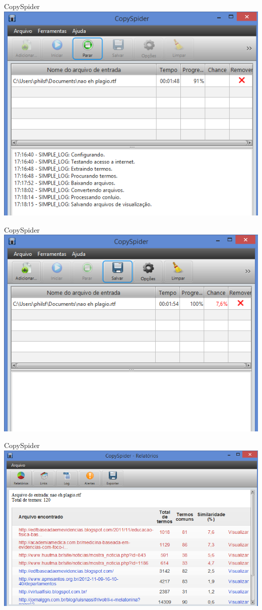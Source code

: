 \documentclass{beamer}
\begin{document}
\begin{frame}{CopySpider}
  \includegraphics[height=.95\textheight]{Referencias/copyspider1}
\end{frame}

\begin{frame}{CopySpider}
  \includegraphics[height=.95\textheight]{Referencias/copyspider2}
\end{frame}

\begin{frame}{CopySpider}
  \includegraphics[width=\textwidth]{Referencias/copyspider3}
\end{frame}
\end{document}
